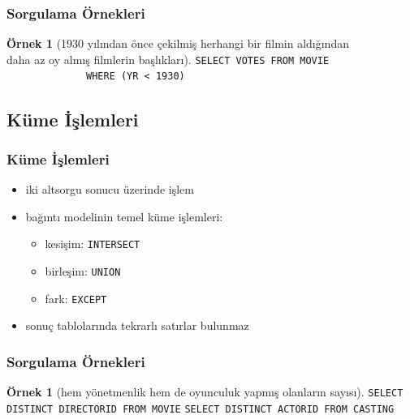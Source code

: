 \documentclass[dvipsnames]{beamer}
\theoremstyle{definition}
\theoremstyle{example}
\newtheorem{ornek}[theorem]{Örnek}
\theoremstyle{plain}
\begin{document}
\begin{frame}[fragile]
  \frametitle{Sorgulama Örnekleri}

  \begin{ornek}[1930 yılından önce çekilmiş herhangi bir filmin aldığından\\
                daha az oy almış filmlerin başlıkları]
\lstinline!SELECT VOTES FROM MOVIE!\\
~~~~~~~~~~~~~~\lstinline!WHERE (YR < 1930)!
  \end{ornek}
\end{frame}

\subsection{Küme İşlemleri}

\begin{frame}
  \frametitle{Küme İşlemleri}

  \begin{itemize}
    \item iki altsorgu sonucu üzerinde işlem

    \item bağıntı modelinin temel küme işlemleri:
    \begin{itemize}
      \item kesişim: \lstinline!INTERSECT!
      \item birleşim: \lstinline!UNION!
      \item fark: \lstinline!EXCEPT!
    \end{itemize}

    \pause
    \item sonuç tablolarında tekrarlı satırlar bulunmaz
  \end{itemize}
\end{frame}

\begin{frame}[fragile]
  \frametitle{Sorgulama Örnekleri}

  \begin{ornek}[hem yönetmenlik hem de oyunculuk yapmış olanların sayısı]
\lstinline!SELECT DISTINCT DIRECTORID FROM MOVIE!
\lstinline!SELECT DISTINCT ACTORID FROM CASTING!
  \end{ornek}
\end{frame}
\end{document}
